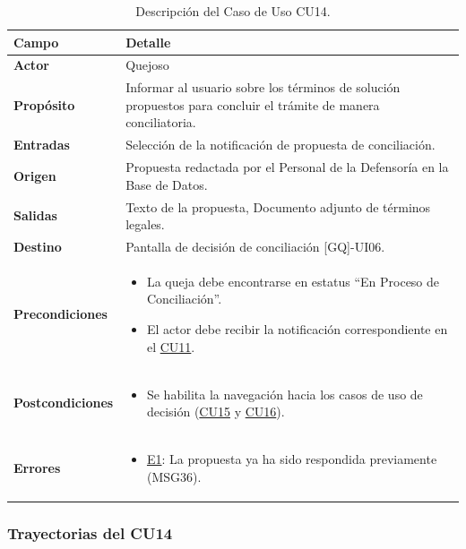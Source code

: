 \begin{appendices}
\begin{table}[htbp]
\centering
\small
{}
\begin{tabular}{|p{3.5cm}|p{10.5cm}|}
\hline
\rowcolor[HTML]{EFEFEF} 
\textbf{Campo} & \textbf{Detalle} \\ \hline
\textbf{Actor} & Quejoso \\ \hline
\textbf{Propósito} & Informar al usuario sobre los términos de solución propuestos para concluir el trámite de manera conciliatoria. \\ \hline
\textbf{Entradas} & Selección de la notificación de propuesta de conciliación. \\ \hline
\textbf{Origen} & Propuesta redactada por el Personal de la Defensoría en la Base de Datos. \\ \hline
\textbf{Salidas} & Texto de la propuesta, Documento adjunto de términos legales. \\ \hline
\textbf{Destino} & Pantalla de decisión de conciliación [GQ]-UI06. \\ \hline
\textbf{Precondiciones} & 
\begin{itemize}[nosep, leftmargin=*]
    \item La queja debe encontrarse en estatus ``En Proceso de Conciliación''.
    \item El actor debe recibir la notificación correspondiente en el \hyperlink{anexo:casos_uso}{CU11}.
\end{itemize} \\ \hline
\textbf{Postcondiciones} & 
\begin{itemize}[nosep, leftmargin=*]
    \item Se habilita la navegación hacia los casos de uso de decisión (\hyperlink{anexo:casos_uso}{CU15} y \hyperlink{anexo:casos_uso}{CU16}).
\end{itemize} \\ \hline
\textbf{Errores} & 
\begin{itemize}[nosep, leftmargin=*]
    \item \hyperlink{err:E19}{E1}: La propuesta ya ha sido respondida previamente (MSG36).
\end{itemize} \\ \hline
\end{tabular}
\caption{Descripción del Caso de Uso CU14.}
\label{tab:cu14_especificacion}
\end{table}

\subsubsection{Trayectorias del CU14}


\end{appendices}
